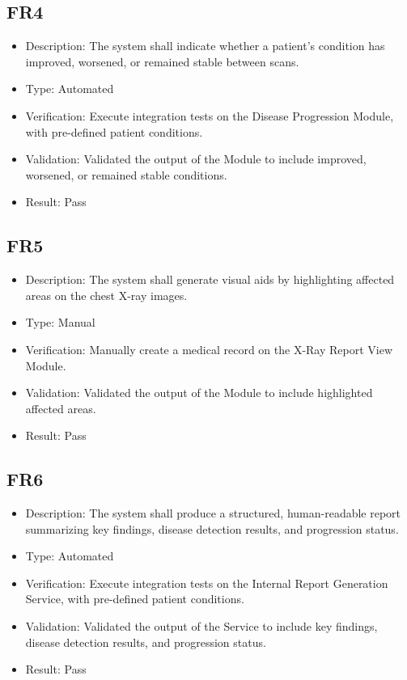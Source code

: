 \documentclass[12pt, titlepage]{article}
\begin{document}
\subsection{FR4}
\begin{itemize}  
  \item Description: The system shall indicate whether a patient's condition has improved, worsened, or remained stable between scans.
  \item Type: Automated
  \item Verification: Execute integration tests on the Disease Progression Module, with pre-defined patient conditions.
  \item Validation: Validated the output of the Module to include improved, worsened, or remained stable conditions.
  \item Result: Pass
\end{itemize}

\subsection{FR5}
\begin{itemize}  
  \item Description: The system shall generate visual aids by highlighting affected areas on the chest X-ray images.
  \item Type: Manual
  \item Verification: Manually create a medical record on the X-Ray Report View Module.
  \item Validation: Validated the output of the Module to include highlighted affected areas.
  \item Result: Pass
\end{itemize}

\subsection{FR6}
\begin{itemize}  
  \item Description: The system shall produce a structured, human-readable report summarizing key findings, disease detection results, and progression status.
  \item Type: Automated
  \item Verification: Execute integration tests on the Internal Report Generation Service, with pre-defined patient conditions.
  \item Validation: Validated the output of the Service to include key findings, disease detection results, and progression status.
  \item Result: Pass
\end{itemize}
\end{document}
